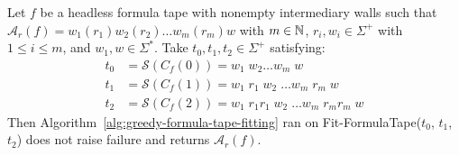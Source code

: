 

\begin{theorem}\label{th:greedy-formula-tape-fitting}
    Let $f$ be a headless formula tape with nonempty intermediary walls such that $\mathcal{A}_r(f) = w_1 (r_1) w_2 (r_2)\dots w_m (r_m) w$ with $m\in\mathbb{N}$, $r_i, w_i \in \Sigma^+$ with $1 \leq i \leq m$, and $w_1, w \in \Sigma^*$. Take $t_0, t_1, t_2 \in \Sigma^+$ satisfying:
    \begin{align*}
        t_0 & = \mathcal{S}(C_f(0))  = w_1\; w_2 \dots w_m\; w                       \\
        t_1 & = \mathcal{S}(C_f(1))  = w_1\; r_1\; w_2\; \dots w_m\; r_m\; w         \\
        t_2 & = \mathcal{S}(C_f(2))  = w_1\; r_1 r_1\; w_2\; \dots w_m\; r_m r_m\; w
    \end{align*}
    Then Algorithm~\ref{alg:greedy-formula-tape-fitting} ran on {\sc Fit-FormulaTape}($t_0$, $t_1$, $t_2$) does not raise failure and returns $\mathcal{A}_r(f)$.

\end{theorem}
